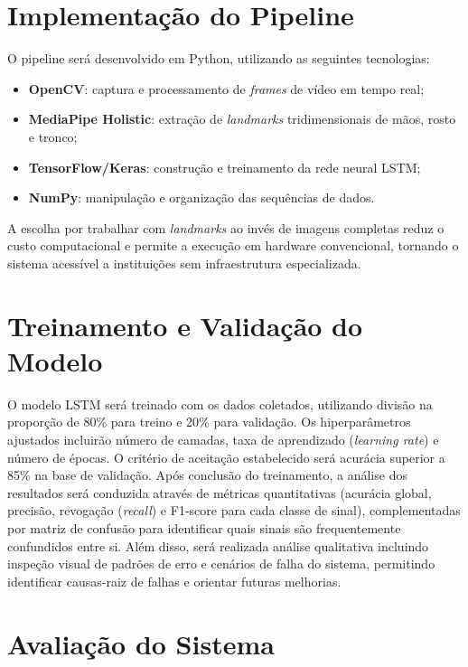 \section{Implementação do Pipeline}

O pipeline será desenvolvido em Python, utilizando as seguintes tecnologias:

\begin{itemize}
    \item \textbf{OpenCV}: captura e processamento de \textit{frames} de vídeo em tempo real;
    \item \textbf{MediaPipe Holistic}: extração de \textit{landmarks} tridimensionais de mãos, rosto e tronco;
    \item \textbf{TensorFlow/Keras}: construção e treinamento da rede neural LSTM;
    \item \textbf{NumPy}: manipulação e organização das sequências de dados.
\end{itemize}

A escolha por trabalhar com \textit{landmarks} ao invés de imagens completas reduz o custo computacional e permite a execução em hardware convencional, tornando o sistema acessível a instituições sem infraestrutura especializada.

\section{Treinamento e Validação do Modelo}

O modelo LSTM será treinado com os dados coletados, utilizando divisão na proporção de 80\% para treino e 20\% para validação. Os hiperparâmetros ajustados incluirão número de camadas, taxa de aprendizado (\textit{learning rate}) e número de épocas. O critério de aceitação estabelecido será acurácia superior a 85\% na base de validação. Após conclusão do treinamento, a análise dos resultados será conduzida através de métricas quantitativas (acurácia global, precisão, revogação (\textit{recall}) e F1-score para cada classe de sinal), complementadas por matriz de confusão para identificar quais sinais são frequentemente confundidos entre si. Além disso, será realizada análise qualitativa incluindo inspeção visual de padrões de erro e cenários de falha do sistema, permitindo identificar causas-raiz de falhas e orientar futuras melhorias.

\section{Avaliação do Sistema}

